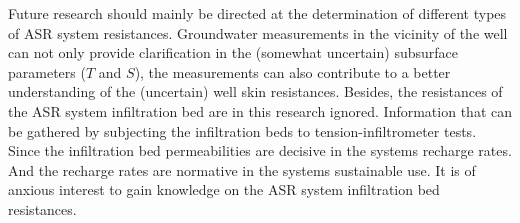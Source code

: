 %
%


Future research should mainly be directed at the determination of different types of ASR system resistances. Groundwater measurements in the vicinity of the well can not only provide clarification in the (somewhat uncertain) subsurface parameters ($T$ and $S$), the measurements can also contribute to a better understanding of the (uncertain) well skin resistances. Besides, the resistances of the ASR system infiltration bed are in this research ignored. Information that can be gathered by subjecting the infiltration beds to tension-infiltrometer tests. Since the infiltration bed permeabilities are decisive in the systems recharge rates. And the recharge rates are normative in the systems sustainable use. It is of anxious interest to gain knowledge on the ASR system infiltration bed resistances. \\


